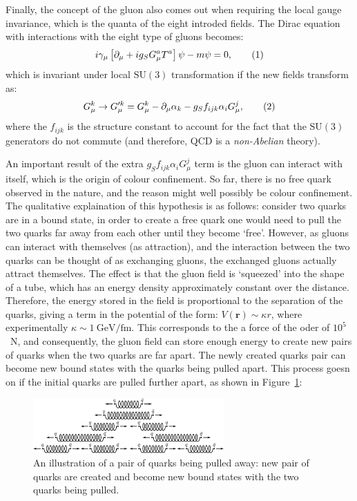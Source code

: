 Finally, the concept of the gluon also comes out when requiring the local gauge invariance, 
which is the quanta of the eight introded fields. 
The Dirac equation with interactions with the eight type of gluons becomes:
\[
    i\gamma_\mu \left[  \partial_\mu + ig_S G^a_\mu T^a \right] \psi - m\psi = 0   ,\addtag \]
which is invariant under local $\text{SU}(3)$ transformation if the new fields transform as:
\[
    G^k_\mu \rightarrow G'^k_\mu = G^k_\mu - \partial_\mu \alpha_k - g_S f_{ijk} \alpha_i G^j_\mu ,\addtag \]
where the $f_{ijk}$ is the structure constant to account for the fact that the $\text{SU}(3)$ 
generators do not commute (and therefore, QCD is a \textit{non-Abelian} theory). 

An important result of the extra $g_S f_{ijk} \alpha_i G^j_\mu$ term is the gluon can interact with itself, 
which is the origin of colour confinement.
So far, there is no free quark observed in the nature, and the reason might well
possibly be colour confinement. 
The qualitative explaination of this hypothesis is as follows:
consider two quarks are in a bound state, 
in order to create a free quark one would need to pull the two quarks
far away from each other until they become `free'. 
However, as gluons can interact with themselves (as attraction),
and the interaction between the two quarks can be thought of as exchanging gluons, 
the exchanged gluons actually attract themselves. The effect is that the gluon field is `squeezed'
into the shape of a tube, which has an energy density approximately constant over the distance.
Therefore, the energy stored in the field is proportional to the separation of the quarks,
giving a term in the potential of the form: $V(\textbf{r})\sim \kappa r$, where experimentally
$\kappa \sim 1\ \text{GeV/fm}$. This corresponds to the a force of the oder of $10^5$~N, and 
consequently, the gluon field can store enough energy to create new pairs
of quarks when the two quarks are far apart. The newly created quarks pair 
can become new bound states with the quarks being pulled apart. This process goesn on if
the initial quarks are pulled further apart, as shown in Figure~\ref{fig:SM:confinement}:

\begin{figure}[htbp]
    \centering
    \includegraphics[width=0.65\textwidth]{Theory/plots/confinement.png}
    \caption{ An illustration of a pair of quarks being pulled away: new pair of quarks 
    are created and become new bound states with the two quarks being pulled. 
    }
\label{fig:SM:confinement}
\end{figure}


